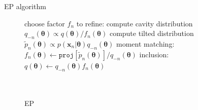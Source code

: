 \documentclass[mathserif]{beamer}
\begin{document}

\begin{frame}{EP algorithm}

\begin{figure}[!t]
\begin{minipage}[t]{0.45\linewidth}
\centering
\begin{algorithm}[H] 
\renewcommand{\thealgorithm}{}
\caption{EP} 
\label{alg:ep} 
\begin{algorithmic}[1] 
	\STATE  choose factor $f_n$ to refine:
	\STATE compute cavity distribution \\$q_{-n}(\bm{\theta}) \propto q(\bm{\theta}) / f_n(\bm{\theta})$ 
	\STATE compute tilted distribution \\$\tilde{p}_n(\bm{\theta}) \propto p(\bm{x}_n|\bm{\theta}) q_{-n}(\bm{\theta})$
	\STATE moment matching: \\ \hspace{-1mm}$f_n(\bm{\theta}) \leftarrow \mathtt{proj}[\tilde{p}_n(\bm{\theta})] / q_{-n}(\bm{\theta}) $
	\STATE inclusion:\\ $q(\bm{\theta}) \leftarrow q_{-n}(\bm{\theta}) f_n(\bm{\theta})$\\\hspace{1mm}\\ \vspace{1.5mm} \hspace{1mm}\\
\end{algorithmic}
\end{algorithm}
\end{minipage}
%

%
\end{figure}
\end{frame}
\end{document}
